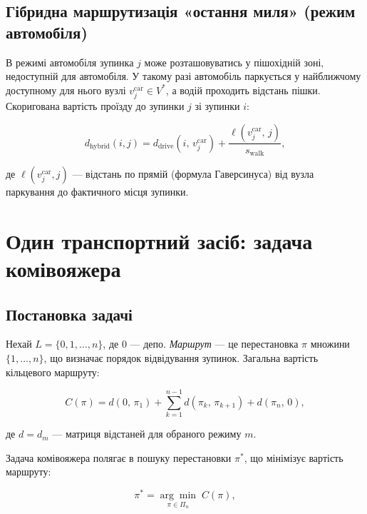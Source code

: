 \documentclass[12pt, a4paper]{article}
\theoremstyle{definition}
\begin{document}
\subsection{Гібридна маршрутизація «остання миля» (режим автомобіля)}

В режимі автомобіля зупинка $j$ може розташовуватись у пішохідній зоні,
недоступній для автомобіля. У такому разі автомобіль паркується у найближчому
доступному для нього вузлі $v_j^{\text{car}} \in V^*$, а водій проходить
відстань пішки. Скоригована вартість проїзду до зупинки $j$ зі зупинки $i$:

\begin{equation}
  \label{eq:hybrid}
  d_{\text{hybrid}}(i, j) = d_{\text{drive}}(i,\, v_j^{\text{car}})
    + \frac{\ell(v_j^{\text{car}},\, j)}{s_{\text{walk}}},
\end{equation}

\noindent де $\ell(v_j^{\text{car}}, j)$ --- відстань по прямій (формула
Гаверсинуса) від вузла паркування до фактичного місця зупинки.

\section{Один транспортний засіб: задача комівояжера}

\subsection{Постановка задачі}

Нехай $L = \{0, 1, \ldots, n\}$, де $0$ --- депо. \emph{Маршрут} --- це
перестановка $\pi$ множини $\{1, \ldots, n\}$, що визначає порядок відвідування
зупинок. Загальна вартість кільцевого маршруту:

\begin{equation}
  \label{eq:tsp_cost}
  C(\pi) = d(0,\, \pi_1)
    + \sum_{k=1}^{n-1} d(\pi_k,\, \pi_{k+1})
    + d(\pi_n,\, 0),
\end{equation}

\noindent де $d = d_m$ --- матриця відстаней для обраного режиму $m$.

Задача комівояжера полягає в пошуку перестановки $\pi^*$, що мінімізує
вартість маршруту:

\begin{equation}
  \label{eq:tsp}
  \pi^* = \underset{\pi \in \Pi_n}{\arg\min}\; C(\pi),
\end{equation}
\end{document}
